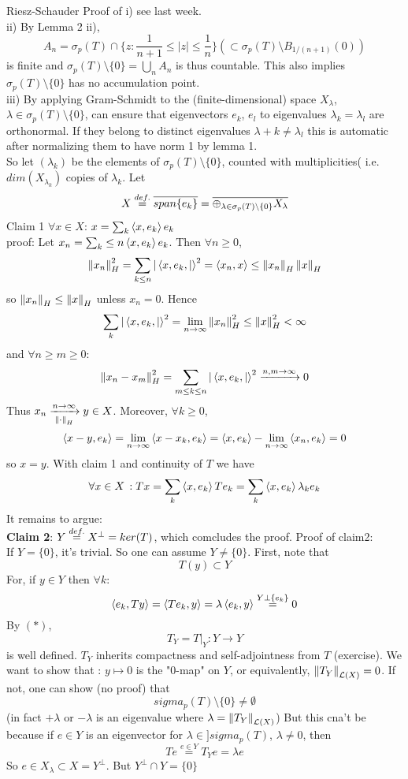 \begin{pf}{Riesz-Schauder}{}
	Proof of i) see last week.\\
	ii) By Lemma 2 ii),
	$$A_n=\sigma_p(T)\cap\{z:\frac{1}{n+1}\leq|z|\leq\frac{1}{n}\}(\subset \sigma_p(T)\setminus B_{1/(n+1)}(0))$$
	is finite and $\sigma_p(T)\setminus\{0\}=\bigcup_n A_n$ is thus countable. This also implies $\sigma_p(T)\setminus\{0\}$ has no accumulation point.\\
	iii) By applying Gram-Schmidt to the (finite-dimensional) space $X_\lambda$, $\lambda\in\sigma_p(T)\setminus\{0\}$, can ensure that eigenvectors $e_k$, $e_l$ to eigenvalues $\lambda_k=\lambda_l$ are orthonormal. If they belong
	to distinct eigenvalues $\lambda+k\neq\lambda_l$ this is automatic after normalizing them to have norm 1 by lemma 1.\\
	So let $(\lambda_k)$ be the elements of $\sigma_p(T)\setminus\{0\}$, counted with multiplicities( i.e. $dim(X_{\lambda_k})$ copies of $\lambda_k$. Let
	$$
		X\stackrel{def.}{=}\overline{span\{e_k\}}=\overline{\oplus_{\lambda\in\sigma_p(T)\setminus\{0\}}X_\lambda}
	$$
	Claim 1 $\forall x\in X$: $x=\sum_k \left<{x},{e_k}\right>e_k$\\
	proof: Let $x_n=\sum_k\leq n \left<{x},{e_k}\right>e_k$.
	Then $\forall n\geq0$,
	$$
		\left\|{x_n}\right\|_H^2=\sum_{k\leq n}|\left<{x,e_k},{|}\right>^2=\left<{x_n},{x}\right>\leq\left\|{x_n}\right\|_H\left\|{x}\right\|_H$$
	so $\left\|{x_n}\right\|_H\leq\left\|{x}\right\|_H$ unless $x_n=0$. Hence
	$$\sum_{k}|\left<{x,e_k},{|}\right>^2=\lim_{n\to\infty}\left\|{x_n}\right\|_H^2\leq\left\|{x}\right\|_H^2<\infty$$
	and $\forall n\geq m\geq0$:
	$$\left\|{x_n-x_m}\right\|^2_H=\sum_{m\leq k\leq n}|\left<{x,e_k},{|}\right>^2\xrightarrow{n,m\to\infty}0$$
	Thus $x_n\xrightarrow[\left\|{\cdot}\right\|_H]{n\to\infty}y\in X$. Moreover, $\forall k\geq 0$,
	$$\left<{x-y},{e_k}\right>=\lim_{n\to\infty}\left<{x-x_k},{e_k}\right>=\left<{x},{e_k}\right>-\lim_{n\to\infty}\left<{x_n},{e_k}\right>=0$$
	so $x=y$. With claim 1 and continuity of $T$ we have
	$$\forall x\in X\,: Tx=\sum_k \left<{x},{e_k}\right>Te_k=\sum_k \left<{x},{e_k}\right>\lambda_ke_k$$
	It remains to argue:\\
	{\bf Claim 2}: $Y\stackrel{def.}{=} X^\perp=ker(T)$, which comcludes the proof.
	Proof of claim2:\\
	If $Y=\{0\}$, it's trivial. So one can assume $Y\neq\{0\}$. First, note that
	\begin{equation}T(y)\subset Y\tag{$*$}\end{equation}
	For, if $y\in Y$ then $\forall k$:
	\[\left<{e_k},{Ty}\right>=\left<{Te_k},{y}\right>=\lambda\left<{e_k},{y}\right>\stackrel{Y\perp\{e_k\}}{=}0\]
	By $(*)$,
	\[T_Y=T|_Y:Y\to Y\] is well defined. $T_Y$ inherits compactness and self-adjointness from $T$ (exercise). We want to show that : $y\mapsto0 $ is the  "0-map" on $Y$, or equivalently, $\left\|{T_Y}\right\|_{\mathcal{L}(X)}=0$. If not, one can show (no proof) that
	\[sigma_p(T)\setminus\{0\}\neq\emptyset\]
	(in fact $+\lambda$ or $-\lambda$ is an eigenvalue where $\lambda=\left\|{T_Y}\right\|_{\mathcal{L}(X)}$) But this cna't be because if $e\in Y$ is an eigenvector for $\lambda\in]sigma_p(T)$, $\lambda\neq 0$, then
	\[Te\stackrel{e\in Y}{=}T_Y e=\lambda e\]
	So $e\in X_\lambda\subset X=Y^\perp$. But $Y^\perp\cap Y=\{0\}$
\end{pf}
